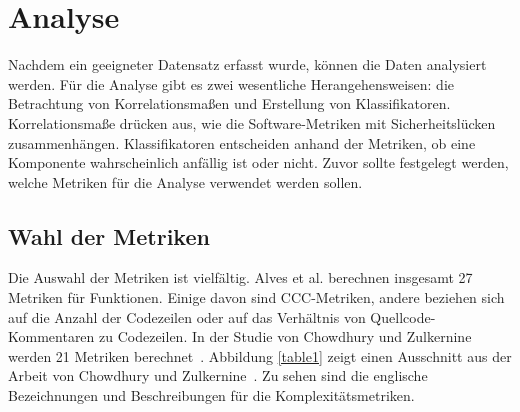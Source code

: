 \section{Analyse}
\label{sec:analyse}
Nachdem ein geeigneter Datensatz erfasst wurde, können die Daten analysiert werden.
Für die Analyse gibt es zwei wesentliche Herangehensweisen: die Betrachtung von Korrelationsmaßen und Erstellung von Klassifikatoren.
Korrelationsmaße drücken aus, wie die Software-Metriken mit Sicherheitslücken zusammenhängen.
Klassifikatoren entscheiden anhand der Metriken, ob eine Komponente wahrscheinlich anfällig ist oder nicht.
Zuvor sollte festgelegt werden, welche Metriken für die Analyse verwendet werden sollen.

\subsection{Wahl der Metriken}
Die Auswahl der Metriken ist vielfältig.
Alves et al. berechnen insgesamt 27 Metriken für Funktionen.
Einige davon sind CCC-Metriken, andere beziehen sich auf die Anzahl der Codezeilen oder auf das Verhältnis von Quellcode-Kommentaren zu Codezeilen.
In der Studie von Chowdhury und Zulkernine werden 21 Metriken berechnet~\cite{chowdhury_zulkernine_2009}.
Abbildung \ref{table1} zeigt einen Ausschnitt aus der Arbeit von Chowdhury und Zulkernine~\cite{chowdhury_zulkernine_2010}.
Zu sehen sind die englische Bezeichnungen und Beschreibungen für die Komplexitätsmetriken.

